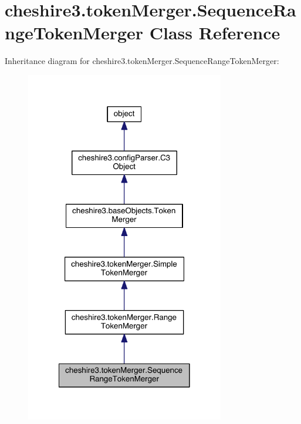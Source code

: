 \hypertarget{classcheshire3_1_1token_merger_1_1_sequence_range_token_merger}{\section{cheshire3.\-token\-Merger.\-Sequence\-Range\-Token\-Merger Class Reference}
\label{classcheshire3_1_1token_merger_1_1_sequence_range_token_merger}
}


Inheritance diagram for cheshire3.\-token\-Merger.\-Sequence\-Range\-Token\-Merger\-:
\nopagebreak
\begin{figure}[H]
\begin{center}
\leavevmode
\includegraphics[width=246pt]{classcheshire3_1_1token_merger_1_1_sequence_range_token_merger__inherit__graph}
\end{center}
\end{figure}


